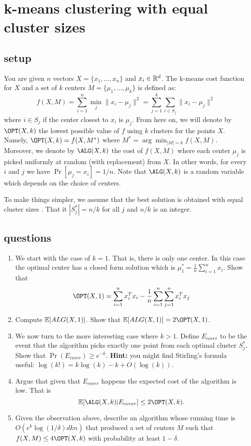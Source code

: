 \documentclass{article}
\begin{document}



\section{k-means clustering with equal cluster sizes}
\subsection*{setup}
You are given $n$ vectors $X = \{x_1,\ldots,x_n\} $ and $x_i \in {\mathbb{R}}^{d}$. 
The k-means cost function for $X$ and a set of $k$ centers $M = \{\mu_1,\ldots,\mu_k\}$ is defined as:
\[
f(X, M) = \sum_{i=1}^{n} \min_j \|x_i - \mu_j\|^2 = \sum_{j=1}^{k} \sum_{i \in S_j} \|x_i - \mu_j\|^2
\]
where $i \in S_j$  if the center closest to $x_i$ is $\mu_j$.
From here on, we will denote by $\OPT(X,k)$ the lowest possible value of $f$ using $k$ clusters for the points $X$.
Namely, $\OPT(X,k) = f(X,M^*)$ where $M^{*} =  \arg\min_{|M|=k} f(X,M)$. %
%
Moreover, we denote by $\ALG(X,k)$ the cost of $f(X,M)$ where each center $\mu_j$ is picked uniformly at random (with replacement) from $X$.
In other words, for every $i$ and $j$ we have $\Pr[\mu_j = x_i] = 1/n$. Note that $\ALG(X,k)$ is a random variable which depends on the choice of centers.

To make things simpler, we assume that the best solution is obtained with equal cluster sizes . That it $|S^{*}_j| = n/k$ for all $j$ and $n/k$ is an integer.
\subsection*{questions}
\begin{enumerate}
\item We start with the case of $k=1$. That is, there is only one center. In this case the optimal center has a closed form solution which is $\mu^{*}_1 = \frac{1}{n}\sum_{i=1}^{n}x_i$.
Show that
\[
\OPT(X,1) = \sum_{i=1}^{n}x_i^{T}x_i - \frac{1}{n}\sum_{i=1}^{n}\sum_{j=1}^{n}x_i^{T}x_j
\]
\item Compute ${\mathbb E}[ALG(X,1)]$. Show that $\E[ALG(X,1)] = 2 \OPT(X,1)$.
\item We now turn to the more interesting case where $k>1$. 
Define $E_{cover}$ to be the event that the algorithm picks exactly one point from each optimal cluster $S^{*}_{j}$.
Show that $\Pr(E_{cover}) \ge e^{-k}$.
{\bf Hint:} you might find Stirling's formula useful: $\log(k!) = k\log(k) - k + O(\log(k))$.
\item Argue that given that $E_{cover}$ happens the expected cost of the algorithm is low. That is 
$$\E[\ALG(X,k) | E_{cover}] \le 2\OPT(X,k).$$
\item Given the observation above, describe an algorithm whose running time is $O(e^{k}\log(1/\delta)dkn)$ that produced 
a set of centers $M$ such that $f(X,M) \le 4\OPT(X,k)$ with probability at least $1-\delta$.
\end{enumerate}
\pagebreak



\end{document}
